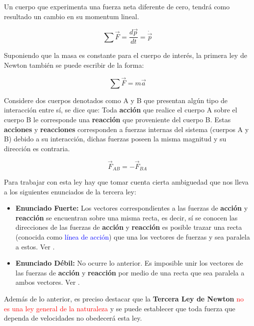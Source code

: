 \documentclass[/home/hernan/Documentos/Apuntes_mecanica_teorica/main.tex]{subfiles}
\begin{document}
	
	\begin{definition}
		Un cuerpo que experimenta una fuerza neta diferente de cero, tendrá como resultado un cambio en su momentum lineal.
		
		\begin{equation}
			\sum \vec{F} = \frac{d \vec{p}}{dt} = \dot{\vec{p}}
			\label{eq: NSecondlaw}
		\end{equation}

		Suponiendo que la masa es constante para el cuerpo de interés, la primera ley de Newton también se puede escribir de la forma:

		\begin{equation}
			\sum \vec{F} = m \vec{a}
		\end{equation}
	\end{definition}


	\begin{definition}
		Considere dos cuerpos denotados como A y B que presentan algún tipo de interacción entre sí, se dice que:
		Toda \textbf{acción} que realice el cuerpo A sobre el cuerpo B le corresponde una \textbf{reacción} que proveniente del cuerpo B. Estas \textbf{acciones} y \textbf{reacciones} corresponden a fuerzas internas del sistema (cuerpos A y B) debido a su interacción, dichas fuerzas poseen la misma magnitud y su dirección es contraria.
		
		\begin{equation}
			\vec{F}_{AB} = - \vec{F}_{BA}
			\label{eq: NThirdlaw}
		\end{equation}

		Para trabajar con esta ley hay que tomar cuenta cierta ambiguedad que nos lleva a los siguientes enunciados de la tercera ley:
		\begin{itemize}
			\item \textbf{Enunciado Fuerte: } Los vectores correspondientes a las fuerzas de \textbf{acción} y \textbf{reacción} se encuentran sobre una misma recta, es decir, sí se conocen las direcciones de las fuerzas de \textbf{acción} y \textbf{reacción} es posible trazar una recta (conocida como \textcolor{blue}{línea de acción}) que una los vectores de fuerzas y sea paralela a estos. Ver .
			\item \textbf{Enunciado Débil: } No ocurre lo anterior. Es imposible unir los vectores de las fuerzas de \textbf{acción} y \textbf{reacción} por medio de una recta que sea paralela a ambos vectores. Ver .
		\end{itemize}

		Además de lo anterior, es preciso destacar que la \textbf{Tercera Ley de Newton} \textcolor{red}{no es una ley general de la naturaleza} y se puede establecer que toda fuerza que dependa de velocidades no obedecerá esta ley.
	\end{definition}
\end{document}

